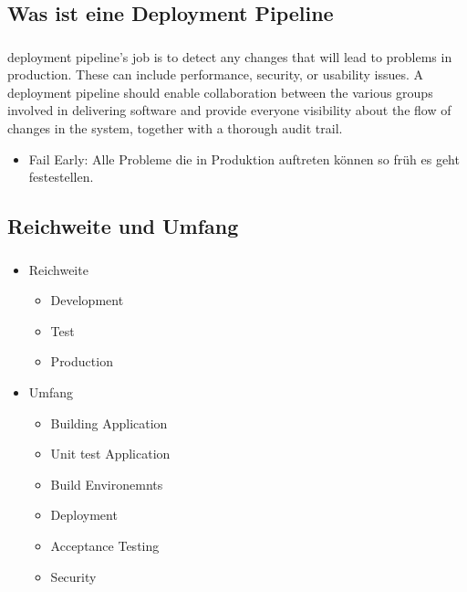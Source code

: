 \documentclass[aspectratio=169]{beamer}
\begin{document}
\begin{frame}

\subsection{Was ist eine Deployment Pipeline}
\frametitle{\subsecname}\framesubtitle{\secname}
deployment pipeline's job is to detect any changes that will lead to problems in production. These can include performance, security, or usability issues. A deployment pipeline should enable collaboration between the various groups involved in delivering software and provide everyone visibility about the flow of changes in the system, together with a thorough audit trail.
\begin{itemize}[label={$\bullet$}]
\item Fail Early: Alle Probleme die in Produktion auftreten können so früh es geht festestellen.
\end{itemize}
\end{frame}

\subsection{Reichweite und Umfang}
\begin{frame}
\frametitle{\subsecname}\framesubtitle{\secname}
\begin{itemize}
  \item Reichweite
  \begin{itemize}
    \item Development
    \item Test
    \item Production
  \end{itemize}
  \item Umfang
  \begin{itemize}
    \item Building Application
    \item Unit test Application
    \item Build Environemnts
    \item Deployment
    \item Acceptance Testing
    \item Security
  \end{itemize}
\end{itemize}
\end{frame}
\end{document}
